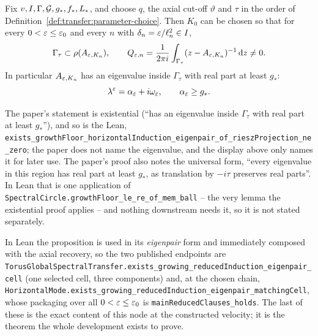 \begin{proposition}
  \label{prop:global-spectral-transfer}
  \leanok
  Fix $v,I,\Gamma,\mathcal{G},g_*,f_*,L_*$, and choose $q$, the axial cut-off $\vartheta$ and
  $\tau$ in the order of Definition~\ref{def:transfer:parameter-choice}.
  Then $K_0$ can be chosen so that for
  every $0<\varepsilon\leq\varepsilon_0$ and every $n$ with $\delta_n=\varepsilon/\ell_n^2\in I$,
  \[
    \Gamma_\tau\subset\rho(A_{\varepsilon,K_n}),\qquad
    Q_{\varepsilon,n}=\frac1{2\pi i}\int_{\Gamma_\tau}(z-A_{\varepsilon,K_n})^{-1}\,\mathrm{d} z\neq0 .
  \]
  In particular $A_{\varepsilon,K_n}$ has an eigenvalue inside $\Gamma_\tau$ with real part at least
  $g_*$:
  \[
    \lambda^\varepsilon=\alpha_\varepsilon+i\omega_\varepsilon,\qquad\alpha_\varepsilon\geq g_* .
  \]
\end{proposition}

The paper's statement is existential (``has an eigenvalue inside $\Gamma_\tau$ with real
part at least $g_*$''), and so is the Lean,
\texttt{exists\_growthFloor\_horizontalInduction\_eigenpair\_of\_rieszProjection\_ne\_zero};
the paper does not name the eigenvalue, and the display above only names it for later use.
The paper's proof also notes the universal form, ``every eigenvalue in this region has real
part at least $g_*$, as translation by $-i\tau$ preserves real parts''.  In Lean that is
one application of \texttt{SpectralCircle.growthFloor\_le\_re\_of\_mem\_ball} -- the very
lemma the existential proof applies -- and nothing downstream needs it, so it is not stated
separately.

In Lean the proposition is used in its \emph{eigenpair} form and immediately composed with
the axial recovery, so the two published endpoints are
\texttt{TorusGlobalSpectralTransfer.exists\_growing\_reducedInduction\_eigenpair\_cell}
(one selected cell, three components) and, at the chosen chain,
\texttt{HorizontalMode.exists\_growing\_reducedInduction\_eigenpair\_matchingCell}, whose
packaging over all $0<\varepsilon\leq\varepsilon_0$ is \texttt{mainReducedClauses\_holds}.  The last of
these is the exact content of this node at the constructed velocity; it is the theorem the
whole development exists to prove.

